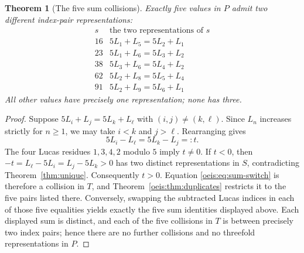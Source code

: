 \documentclass[11pt]{article}
\newtheorem{theorem}{Theorem}[section]
\begin{document}
\begin{theorem}[The five sum collisions]\label{oeis:thm:sums}
Exactly five values in $P$ admit two different index-pair
representations:
\[
\begin{array}{c|l}
s&\text{the two representations of }s\\ \hline
16&5L_1+L_5=5L_2+L_1\\
23&5L_1+L_6=5L_3+L_2\\
38&5L_3+L_6=5L_4+L_2\\
62&5L_2+L_8=5L_5+L_4\\
91&5L_2+L_9=5L_6+L_1
\end{array}
\]
All other values have precisely one representation; none has three.
\end{theorem}
\begin{proof}
Suppose $5L_i+L_j=5L_k+L_\ell$ with $(i,j)\ne(k,\ell)$.
Since $L_n$ increases strictly for $n\ge1$, we may take
$i<k$ and $j>\ell$. Rearranging gives
\begin{equation}\label{oeis:eq:sum-switch}
5L_i-L_\ell=5L_k-L_j=:t.
\end{equation}
The four Lucas residues $1,3,4,2$ modulo $5$ imply
$t\ne0$. If $t<0$, then
$-t=L_\ell-5L_i=L_j-5L_k>0$
has two distinct representations in $S$, contradicting
Theorem~\ref{thm:unique}. Consequently $t>0$.
Equation \eqref{oeis:eq:sum-switch} is therefore a collision
in $T$, and Theorem~\ref{oeis:thm:duplicates} restricts it to
the five pairs listed there.
Conversely, swapping the subtracted Lucas indices in
each of those five equalities yields exactly the five
sum identities displayed above. Each displayed sum is distinct,
and each of the five collisions in $T$ is between precisely
two index pairs; hence there are no further collisions and
no threefold representations in $P$.
\end{proof}
\end{document}
